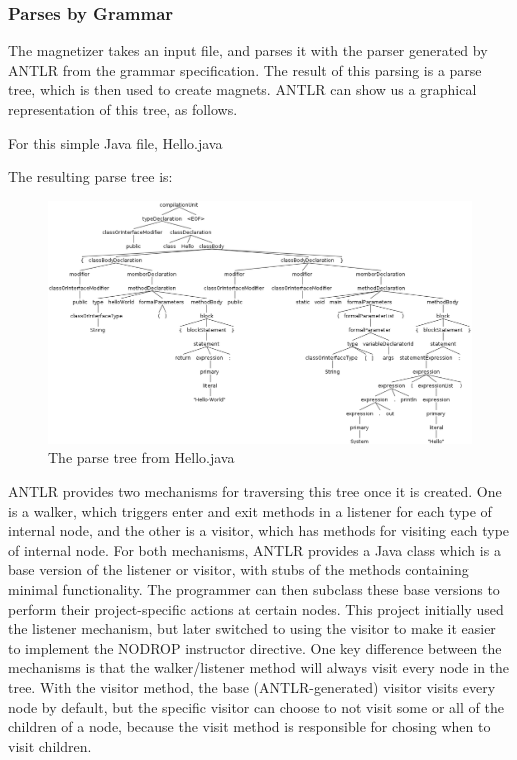 \documentclass[letter,10pt]{article}
\begin{document}
\subsubsection{Parses by Grammar}

The magnetizer takes an input file, and parses it with the parser 
generated by ANTLR from the grammar specification. The result of this 
parsing is a parse tree, which is then used to create magnets. ANTLR 
can show us a graphical representation of this tree, as follows.

For this simple Java file, Hello.java


The resulting parse tree is:

\begin{figure}[h!]
 \centering
 \includegraphics[width=\linewidth]{./images/hello_parse_tree.png}
 \caption{The parse tree from Hello.java}
 \label{fig:hello_parse_tree}
\end{figure}

ANTLR provides two mechanisms for traversing this tree once it is 
created. One is a walker, which triggers enter and exit methods in a 
listener for each type of internal node, and the other is a visitor, 
which has methods for visiting each type of internal node. For 
both mechanisms, ANTLR provides a Java class which is a base version of 
the listener or visitor, with stubs of the methods containing minimal 
functionality. The programmer can then subclass these base 
versions to perform their project-specific actions at certain nodes. 
This project initially used the listener mechanism, but later switched 
to using the visitor to make it easier to implement the NODROP 
instructor directive. One key difference between the mechanisms is that 
the walker/listener method will always visit every node in the tree. 
With the visitor method, the base (ANTLR-generated) visitor visits 
every node by default, but the specific visitor can choose to not visit 
some or all of the children of a node, because the visit method is 
responsible for chosing when to visit children.
\end{document}
